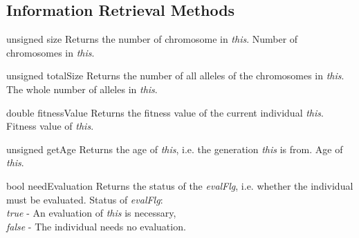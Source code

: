\subsection{Information Retrieval Methods}

\setConstInstance
\printEmptyMethodReturn
{unsigned}
{size}
{Returns the number of chromosome in {\em this}.}
{Number of chromosomes in {\em this}.}

\vspace*{4ex}

\setConstInstance
\printEmptyMethodReturn
{unsigned}
{totalSize}
{Returns the number of all alleles of the chromosomes in {\em this}.}
{The whole number of alleles in {\em this}.}

\vspace*{4ex}

\setConstInstance
\printEmptyMethodReturn
{double}
{fitnessValue}
{Returns the fitness value of the current individual {\em this}.}
{Fitness value of {\em this}.}

\vspace*{4ex}

\setConstInstance
\printEmptyMethodReturn
{unsigned}
{getAge}
{Returns the age of {\em this}, i.e. the generation {\em this} is from.}
{Age of {\em this}.}

\clearpage

\setConstInstance
\printEmptyMethodReturn
{bool}
{needEvaluation}
{Returns the status of the {\em evalFlg}, i.e. whether the individual must 
 be evaluated.}
{Status of {\em evalFlg}:\\
 {\em true} - An evaluation of {\em this} is necessary,\\
 {\em false} - The individual needs no evaluation.}

